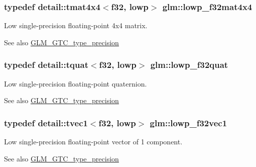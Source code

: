 \subsubsection[{\texorpdfstring{lowp\+\_\+f32mat4x4}{lowp_f32mat4x4}}]{\setlength{\rightskip}{0pt plus 5cm}typedef detail\+::tmat4x4$<$f32, lowp$>$ {\bf glm\+::lowp\+\_\+f32mat4x4}}\hypertarget{group__gtc__type__precision_gab7a6454e1f5d5c434ff316b139eb0231}{}\label{group__gtc__type__precision_gab7a6454e1f5d5c434ff316b139eb0231}
Low single-\/precision floating-\/point 4x4 matrix. \begin{DoxySeeAlso}{See also}
\hyperlink{group__gtc__type__precision}{G\+L\+M\+\_\+\+G\+T\+C\+\_\+type\+\_\+precision} 
\end{DoxySeeAlso}
\subsubsection[{\texorpdfstring{lowp\+\_\+f32quat}{lowp_f32quat}}]{\setlength{\rightskip}{0pt plus 5cm}typedef detail\+::tquat$<$f32, lowp$>$ {\bf glm\+::lowp\+\_\+f32quat}}\hypertarget{group__gtc__type__precision_ga83edc5f21bfa41f72f881b29aabbd919}{}\label{group__gtc__type__precision_ga83edc5f21bfa41f72f881b29aabbd919}
Low single-\/precision floating-\/point quaternion. \begin{DoxySeeAlso}{See also}
\hyperlink{group__gtc__type__precision}{G\+L\+M\+\_\+\+G\+T\+C\+\_\+type\+\_\+precision} 
\end{DoxySeeAlso}
\subsubsection[{\texorpdfstring{lowp\+\_\+f32vec1}{lowp_f32vec1}}]{\setlength{\rightskip}{0pt plus 5cm}typedef detail\+::tvec1$<$f32, lowp$>$ {\bf glm\+::lowp\+\_\+f32vec1}}\hypertarget{group__gtc__type__precision_gae802918ade0497b72c606430830f5ebb}{}\label{group__gtc__type__precision_gae802918ade0497b72c606430830f5ebb}
Low single-\/precision floating-\/point vector of 1 component. \begin{DoxySeeAlso}{See also}
\hyperlink{group__gtc__type__precision}{G\+L\+M\+\_\+\+G\+T\+C\+\_\+type\+\_\+precision} 
\end{DoxySeeAlso}
